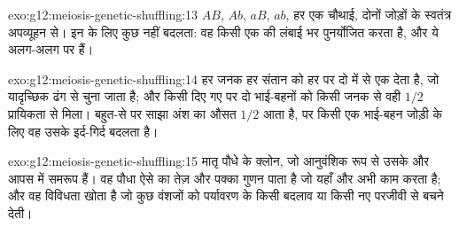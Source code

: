 \begin{solution}{exo:g12:meiosis-genetic-shuffling:13}
$AB$, $Ab$, $aB$, $ab$, हर एक चौथाई, दोनों जोड़ों के स्वतंत्र अपव्यूहन से।
 इन  के लिए कुछ नहीं बदलता: वह किसी एक  की लंबाई भर
 पुनर्योजित करता है, और ये अलग-अलग  पर हैं।
\end{solution}

\begin{solution}{exo:g12:meiosis-genetic-shuffling:14}
हर जनक हर संतान को हर  पर दो  में से एक देता है, जो
यादृच्छिक ढंग से चुना जाता है; और किसी दिए गए  पर दो भाई-बहनों को किसी
जनक से वही  $1/2$ प्रायिकता से मिला। बहुत-से  पर साझा अंश
का औसत $1/2$ आता है, पर किसी एक भाई-बहन जोड़ी के लिए वह उसके इर्द-गिर्द
बदलता है।
\end{solution}

\begin{solution}{exo:g12:meiosis-genetic-shuffling:15}
मातृ पौधे के क्लोन, जो आनुवंशिक रूप से उसके और आपस में समरूप हैं। वह पौधा
ऐसे  का तेज़ और पक्का गुणन पाता है जो यहाँ और अभी काम करता है; और
वह विविधता खोता है जो कुछ वंशजों को पर्यावरण के किसी बदलाव या किसी नए
परजीवी से बचने देती।
\end{solution}

